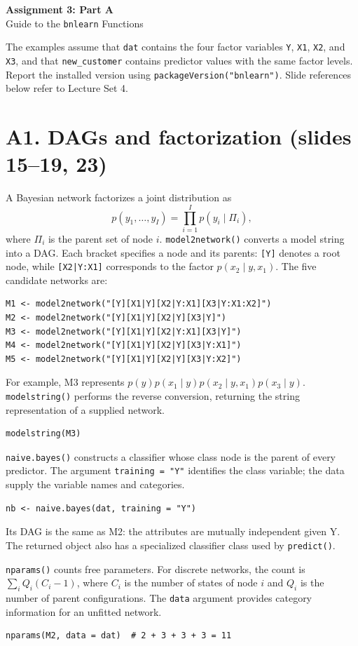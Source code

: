 \documentclass[11pt]{article}
\newcommand{\code}[1]{\texttt{#1}}
\begin{document}
\begin{center}
{\Large\bfseries Assignment 3: Part A}\\[4pt]
{\large Guide to the \texttt{bnlearn} Functions}
\end{center}

The examples assume that \code{dat} contains the four factor variables
\code{Y}, \code{X1}, \code{X2}, and \code{X3}, and that
\code{new\_customer} contains predictor values with the same factor levels.
Report the installed version using \code{packageVersion("bnlearn")}.
Slide references below refer to Lecture Set 4.

\section*{A1. DAGs and factorization \normalfont\small (slides 15--19, 23)}
A Bayesian network factorizes a joint distribution as
\[
 p(y_1,\ldots,y_I)=\prod_{i=1}^{I}p(y_i\mid\Pi_i),
\]
where $\Pi_i$ is the parent set of node $i$.
\code{model2network()} converts a model string into a DAG. Each bracket
specifies a node and its parents: \code{[Y]} denotes a root node, while
\code{[X2|Y:X1]} corresponds to the factor $p(x_2\mid y,x_1)$.
The five candidate networks are:
\begin{lstlisting}
M1 <- model2network("[Y][X1|Y][X2|Y:X1][X3|Y:X1:X2]")
M2 <- model2network("[Y][X1|Y][X2|Y][X3|Y]")
M3 <- model2network("[Y][X1|Y][X2|Y:X1][X3|Y]")
M4 <- model2network("[Y][X1|Y][X2|Y][X3|Y:X1]")
M5 <- model2network("[Y][X1|Y][X2|Y][X3|Y:X2]")
\end{lstlisting}
For example, M3 represents
$p(y)p(x_1\mid y)p(x_2\mid y,x_1)p(x_3\mid y)$.
\code{modelstring()} performs the reverse conversion, returning the
string representation of a supplied network.
\begin{lstlisting}
modelstring(M3)
\end{lstlisting}
\code{naive.bayes()} constructs a classifier whose class node is the parent
of every predictor. The argument \code{training = "Y"} identifies the
class variable; the data supply the variable names and categories.
\begin{lstlisting}
nb <- naive.bayes(dat, training = "Y")
\end{lstlisting}
Its DAG is the same as M2: the attributes are mutually independent given Y.
The returned object also has a specialized classifier class used by
\code{predict()}.

\code{nparams()} counts free parameters. For discrete networks, the count
is $\sum_i Q_i(C_i-1)$, where $C_i$ is the number of states of node $i$
and $Q_i$ is the number of parent configurations. The \code{data} argument
provides category information for an unfitted network.
\begin{lstlisting}
nparams(M2, data = dat)  # 2 + 3 + 3 + 3 = 11
\end{lstlisting}
\end{document}
